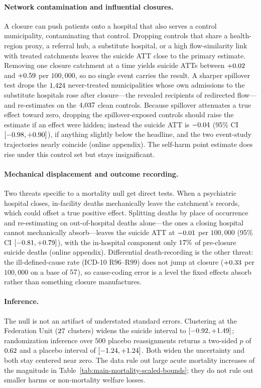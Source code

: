 \paragraph{Network contamination and influential closures.} A closure can
push patients onto a hospital that also serves a control municipality,
contaminating that control. Dropping controls that share a health-region
proxy, a referral hub, a substitute hospital, or a high flow-similarity
link with treated catchments leaves the suicide ATT close to the primary estimate.
Removing one closure catchment at a time yields suicide ATTs between
$+0.02$ and $+0.59$ per $100{,}000$, so no single event carries
the result. A sharper spillover test drops the $1{,}424$
never-treated municipalities whose own admissions to the substitute
hospitals rose after closure---the revealed recipients of redirected
flow---and re-estimates on the $4{,}037$ clean controls. Because
spillover attenuates a true effect toward zero, dropping the
spillover-exposed controls should raise the estimate if an effect were
hidden; instead the suicide ATT is $-0.04$ (95\% CI
$[-0.98, +0.90]$), if anything slightly below the
headline, and the two event-study trajectories nearly coincide (online
appendix). The self-harm point estimate does rise under this control set
but stays insignificant.

\paragraph{Mechanical displacement and outcome recording.} Two threats
specific to a mortality null get direct tests. When a psychiatric
hospital closes, in-facility deaths mechanically leave the catchment's
records, which could offset a true positive effect. Splitting deaths by
place of occurrence and re-estimating on out-of-hospital deaths
alone---the ones a closing hospital cannot mechanically absorb---leaves
the suicide ATT at $-0.01$ per $100{,}000$ (95\% CI
$[-0.81, +0.79]$), with the in-hospital component
only $17\%$ of pre-closure suicide deaths (online appendix). Differential
death-recording is the other threat: the ill-defined-cause rate (ICD-10
R$96$--R$99$) does not jump at closure ($+0.33$ per $100{,}000$ on
a base of $57$), so cause-coding error is a level the fixed
effects absorb rather than something closure manufactures.

\paragraph{Inference.} The null is not an artifact of understated standard
errors. Clustering at the Federation Unit ($27$ clusters)
widens the suicide interval to $[-0.92, +1.49]$;
randomization inference over $500$ placebo reassignments returns a
two-sided $p$ of $0.62$ and a placebo interval of
$[-1.24, +1.24]$. Both widen the uncertainty and both stay
centered near zero. The data rule out large acute mortality increases of
the magnitude in Table~\ref{tab:main-mortality-scaled-bounds}; they do
not rule out smaller harms or non-mortality welfare losses.
